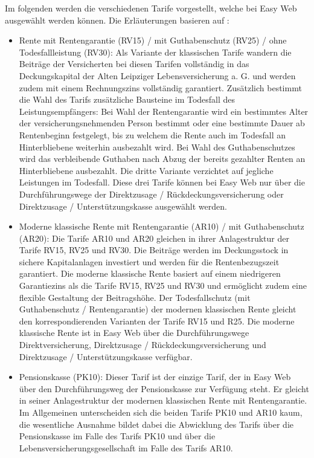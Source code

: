 Im folgenden werden die verschiedenen Tarife vorgestellt, welche bei Easy Web ausgewählt werden können. Die Erläuterungen basieren auf \cite{alh_produkte}:
\begin{itemize}
\item Rente mit Rentengarantie (RV15) / mit Guthabenschutz (RV25) / ohne Todesfallleistung (RV30): Als Variante der klassischen Tarife wandern die Beiträge der Versicherten bei diesen Tarifen vollständig in das Deckungskapital der Alten Leipziger Lebensversicherung a. G. und werden zudem mit einem Rechnungszins vollständig garantiert. Zusätzlich bestimmt die Wahl des Tarifs zusätzliche Bausteine im Todesfall des Leistungsempfängers: Bei Wahl der Rentengarantie wird ein bestimmtes Alter der versicherungsnehmenden Person bestimmt oder eine bestimmte Dauer ab Rentenbeginn festgelegt, bis zu welchem die Rente auch im Todesfall an Hinterbliebene weiterhin ausbezahlt wird. Bei Wahl des Guthabenschutzes wird das verbleibende Guthaben nach Abzug der bereits gezahlter Renten an Hinterbliebene ausbezahlt. Die dritte Variante verzichtet auf jegliche Leistungen im Todesfall. Diese drei Tarife können bei Easy Web nur über die Durchführungswege der Direktzusage / Rückdeckungsversicherung oder Direktzusage / Unterstützungskasse ausgewählt werden.
\item Moderne klassische Rente mit Rentengarantie (AR10) / mit Guthabenschutz (AR20): Die Tarife AR10 und AR20 gleichen in ihrer Anlagestruktur der Tarife RV15, RV25 und RV30. Die Beiträge werden im Deckungsstock in sichere Kapitalanlagen investiert und werden für die Rentenbezugszeit garantiert. Die moderne klassische Rente basiert auf einem niedrigeren Garantiezins als die Tarife RV15, RV25 und RV30 und ermöglicht zudem eine flexible Gestaltung der Beitragshöhe. Der Todesfallschutz (mit Guthabenschutz / Rentengarantie) der modernen klassischen Rente gleicht den korrespondierenden Varianten der Tarife RV15 und R25. Die moderne klassische Rente ist in Easy Web über die Durchführungswege Direktversicherung, Direktzusage / Rückdeckungsversicherung und Direktzusage / Unterstützungskasse verfügbar.
\item Pensionskasse (PK10): Dieser Tarif ist der einzige Tarif, der in Easy Web über den Durchführungsweg der Pensionskasse zur Verfügung steht. Er gleicht in seiner Anlagestruktur der modernen klassischen Rente mit Rentengarantie. Im Allgemeinen unterscheiden sich die beiden Tarife PK10 und AR10 kaum, die wesentliche Ausnahme bildet dabei die Abwicklung des Tarifs über die Pensionskasse im Falle des Tarifs PK10 und über die Lebensversicherungsgesellschaft im Falle des Tarifs AR10.

\end{itemize}

